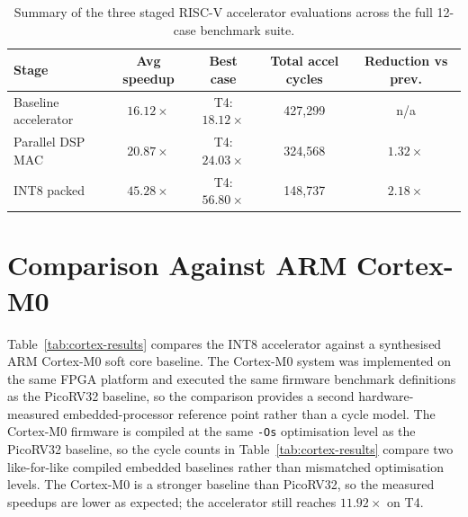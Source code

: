 \begin{table}[htbp]
  \centering
  \small
  \setlength{\tabcolsep}{4pt} %
  \begin{tabular}{lcccc}
  \toprule
  Stage & Avg speedup & Best case & Total accel cycles & Reduction vs prev. \\
  \midrule
  Baseline accelerator & $16.12\times$ & T4: $18.12\times$ & 427,299 & n/a \\
  Parallel DSP MAC     & $20.87\times$ & T4: $24.03\times$ & 324,568 & $1.32\times$ \\
  INT8 packed          & $45.28\times$ & T4: $56.80\times$ & 148,737 & $2.18\times$ \\
  \bottomrule
  \end{tabular}
  \caption{Summary of the three staged RISC-V accelerator evaluations
           across the full 12-case benchmark suite.}
  \label{tab:stage-summary}
\end{table}

\section{Comparison Against ARM Cortex-M0}
\label{sec:cortex}

Table~\ref{tab:cortex-results} compares the INT8 accelerator against a
synthesised ARM Cortex-M0 soft core baseline. The Cortex-M0 system was
implemented on the same FPGA platform and executed the same firmware
benchmark definitions as the PicoRV32 baseline, so the comparison
provides a second hardware-measured embedded-processor reference point
rather than a cycle model. The Cortex-M0 firmware is compiled at the
same \texttt{-Os} optimisation level as the PicoRV32 baseline, so
the cycle counts in Table~\ref{tab:cortex-results} compare two
like-for-like compiled embedded baselines rather than mismatched
optimisation levels. The Cortex-M0 is a stronger baseline than
PicoRV32, so the measured speedups are lower as expected; the
accelerator still reaches $11.92\times$ on T4.

